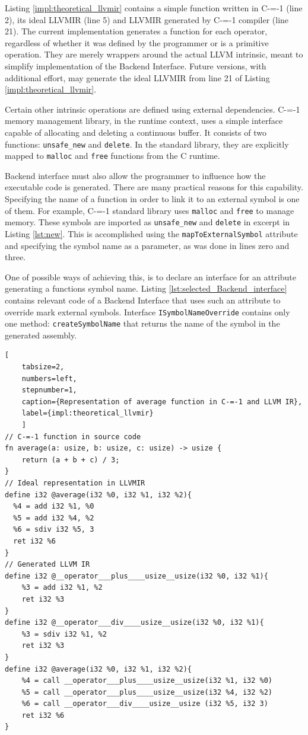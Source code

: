 Listing \ref{impl:theoretical_llvmir} contains a simple function written in C-=-1 (line 2), its ideal LLVMIR (line 5) and LLVMIR generated by C-=-1 compiler (line 21).
The current implementation generates a function for each operator, regardless of whether it was defined by the programmer or is a primitive operation.
They are merely wrappers around the actual LLVM intrinsic, meant to simplify implementation of the Backend Interface.
Future versions, with additional effort, may generate the ideal LLVMIR from line 21 of Listing \ref{impl:theoretical_llvmir}.

Certain other intrinsic operations are defined using external dependencies.
C-=-1 memory management library, in the runtime context, uses a simple interface capable of allocating and deleting a continuous buffer.
It consists of two functions: \lstinline{unsafe_new} and \lstinline{delete}.
In the standard library, they are explicitly mapped to \lstinline{malloc} and \lstinline{free} functions from the C runtime.


Backend interface must also allow the programmer to influence how the executable code is generated.
There are many practical reasons for this capability.
Specifying the name of a function in order to link it to an external symbol is one of them.
For example, C-=-1 standard library uses \lstinline{malloc} and \lstinline{free} to manage memory.
These symbols are imported as \lstinline{unsafe_new} and \lstinline{delete} in excerpt in Listing \ref{lst:new}.
This is accomplished using the \lstinline{mapToExternalSymbol} attribute and specifying the symbol name as a parameter, as was done in lines zero and three.

One of possible ways of achieving this, is to declare an interface for an attribute generating a functions symbol name.
Listing \ref{lst:selected_Backend_interface} contains relevant code of a Backend Interface that uses such an attribute to override mark external symbols.
Interface \lstinline{ISymbolNameOverride} contains only one method: \lstinline{createSymbolName} that returns the name of the symbol in the generated assembly.

\begin{minipage}{\linewidth}
	\begin{lstlisting}[
	tabsize=2,
	numbers=left,
	stepnumber=1,
	caption={Representation of average function in C-=-1 and LLVM IR},
	label={impl:theoretical_llvmir}
	]
// C-=-1 function in source code
fn average(a: usize, b: usize, c: usize) -> usize {
	return (a + b + c) / 3;
}
// Ideal representation in LLVMIR
define i32 @average(i32 %0, i32 %1, i32 %2){
  %4 = add i32 %1, %0
  %5 = add i32 %4, %2
  %6 = sdiv i32 %5, 3
  ret i32 %6
}
// Generated LLVM IR
define i32 @__operator___plus____usize__usize(i32 %0, i32 %1){
	%3 = add i32 %1, %2
	ret i32 %3
}
define i32 @__operator___div____usize__usize(i32 %0, i32 %1){
	%3 = sdiv i32 %1, %2
	ret i32 %3
}
define i32 @average(i32 %0, i32 %1, i32 %2){
	%4 = call __operator___plus____usize__usize(i32 %1, i32 %0)
	%5 = call __operator___plus____usize__usize(i32 %4, i32 %2)
	%6 = call __operator___div____usize__usize (i32 %5, i32 3)
	ret i32 %6
}
\end{lstlisting}
\end{minipage}

